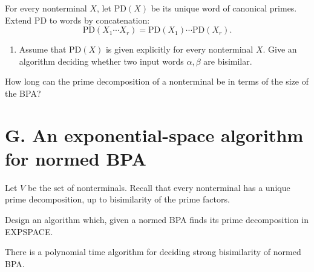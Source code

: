\documentclass[11pt,a4paper,lmodern]{tutorial}
\newcommand{\PD}{\mathrm{PD}}
\begin{document}
\begin{unfinished}
\begin{exercise}
For every nonterminal $X$, let $\PD(X)$ be its unique word of canonical
primes. Extend $\PD$ to words by concatenation:
\[
    \PD(X_1\cdots X_r)
    =
    \PD(X_1)\cdots\PD(X_r).
\]

\begin{enumerate}[label=(\alph*)]
\item Assume that $\PD(X)$ is given explicitly for every nonterminal $X$.
      Give an algorithm deciding whether two input words $\alpha,\beta$
      are bisimilar.
\end{enumerate}
\end{exercise}

\begin{exercise}
How long can the prime decomposition of a nonterminal be 
in terms of the size of the BPA?  
\end{exercise}
\section*{G. An exponential-space algorithm for normed BPA}

Let $V$ be the set of nonterminals.
Recall that every nonterminal has a unique prime decomposition,
up to bisimilarity of the prime factors.

\begin{exercise}
Design an algorithm which, given a normed BPA finds its prime decomposition
in EXPSPACE.

\medskip
\remark 	
There is a polynomial time algorithm for 
deciding strong bisimilarity of normed BPA.
\end{exercise}
\end{unfinished}
\end{document}
